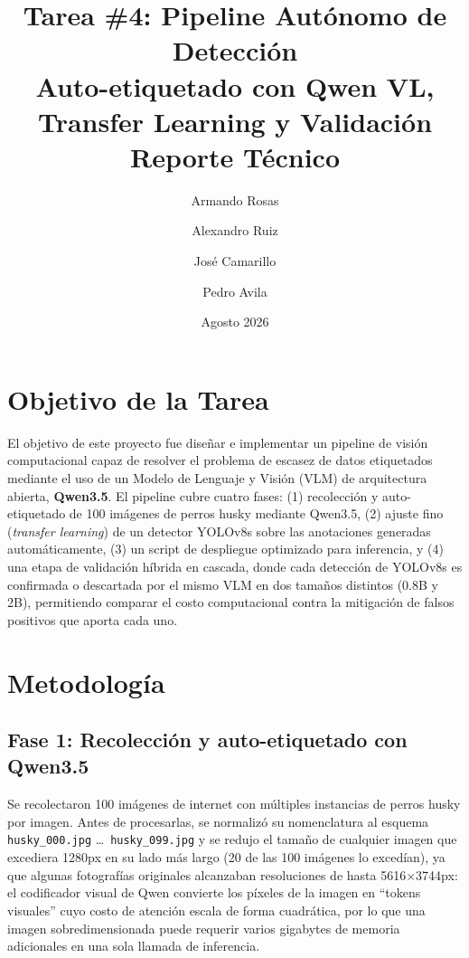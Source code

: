 \documentclass[11pt]{article}
\title{Tarea \#4: Pipeline Autónomo de Detección \\
Auto-etiquetado con Qwen VL, Transfer Learning y Validación \\
\large Reporte Técnico}
\author{
  Armando Rosas \and
  Alexandro Ruiz  \and
  José Camarillo \and
  Pedro Avila
}
\date{Agosto 2026}
\begin{document}
\maketitle
\tableofcontents
\newpage

\section{Objetivo de la Tarea}

El objetivo de este proyecto fue diseñar e implementar un pipeline de visión computacional
capaz de resolver el problema de escasez de datos etiquetados mediante el uso de un Modelo de
Lenguaje y Visión (VLM) de arquitectura abierta, \textbf{Qwen3.5}. El pipeline cubre cuatro
fases: (1) recolección y auto-etiquetado de 100 imágenes de perros husky mediante Qwen3.5, (2)
ajuste fino (\textit{transfer learning}) de un detector YOLOv8s sobre las anotaciones generadas
automáticamente, (3) un script de despliegue optimizado para inferencia, y (4) una etapa de
validación híbrida en cascada, donde cada detección de YOLOv8s es confirmada o descartada por
el mismo VLM en dos tamaños distintos (0.8B y 2B), permitiendo comparar el costo computacional
contra la mitigación de falsos positivos que aporta cada uno.

\section{Metodología}

\subsection{Fase 1: Recolección y auto-etiquetado con Qwen3.5}

Se recolectaron 100 imágenes de internet con múltiples instancias de perros husky por imagen.
Antes de procesarlas, se normalizó su nomenclatura al esquema \texttt{husky\_000.jpg}
\ldots\ \texttt{husky\_099.jpg} y se redujo el tamaño de cualquier imagen que excediera 1280px
en su lado más largo (20 de las 100 imágenes lo excedían), ya que algunas fotografías
originales alcanzaban resoluciones de hasta 5616$\times$3744px: el codificador visual de Qwen
convierte los píxeles de la imagen en ``tokens visuales'' cuyo costo de atención escala de
forma cuadrática, por lo que una imagen sobredimensionada puede requerir varios gigabytes de
memoria adicionales en una sola llamada de inferencia.
\end{document}
